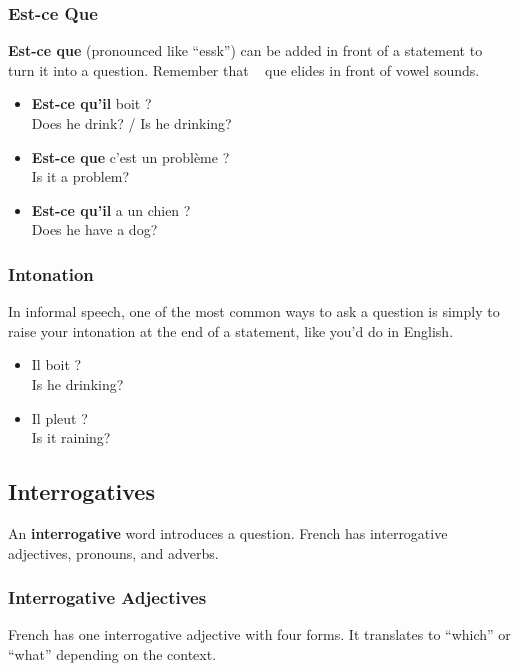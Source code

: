 \subsubsection{Est-ce Que}

\textbf{Est-ce que} (pronounced like ``essk'') can be added in front of a statement to turn it into a question. Remember that \guillemotleft~ que \guillemotright elides in front of vowel sounds.

\begin{itemize}
  \item  \textbf{Est-ce qu'il} boit ? \\ Does he drink? / Is he drinking?
  \item  \textbf{Est-ce que} c'est un probl{\`e}me ? \\ Is it a problem?
  \item  \textbf{Est-ce qu'il} a un chien ? \\ Does he have a dog?
\end{itemize}

\subsubsection{Intonation}

In informal speech, one of the most common ways to ask a question is simply to raise your intonation at the end of a statement, like you'd do in English.

\begin{itemize}
  \item  Il boit ? \\ Is he drinking?
  \item  Il pleut ? \\ Is it raining?
\end{itemize}


\pagebreak
\subsection{Interrogatives}

An \textbf{interrogative} word introduces a question. French has interrogative adjectives, pronouns, and adverbs.

\subsubsection{Interrogative Adjectives}

French has one interrogative adjective with four forms. It translates to ``which'' or ``what'' depending on the context.

